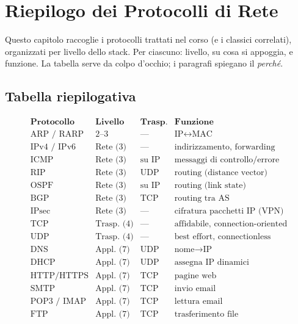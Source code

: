 \documentclass[11pt,a4paper]{report}
\begin{document}
\chapter{Riepilogo dei Protocolli di Rete}

Questo capitolo raccoglie i protocolli trattati nel corso (e i classici
correlati), organizzati per livello dello stack. Per ciascuno: livello, su cosa
si appoggia, e funzione. La tabella serve da colpo d'occhio; i paragrafi
spiegano il \emph{perché}.

\section*{Tabella riepilogativa}
\[
\begin{array}{l|l|l|l}
\textbf{Protocollo} & \textbf{Livello} & \textbf{Trasp.} & \textbf{Funzione} \\ \hline
\text{ARP / RARP} & \text{2--3} & \text{---} & \text{IP}\leftrightarrow\text{MAC} \\
\text{IPv4 / IPv6} & \text{Rete (3)} & \text{---} & \text{indirizzamento, forwarding} \\
\text{ICMP} & \text{Rete (3)} & \text{su IP} & \text{messaggi di controllo/errore} \\
\text{RIP} & \text{Rete (3)} & \text{UDP} & \text{routing (distance vector)} \\
\text{OSPF} & \text{Rete (3)} & \text{su IP} & \text{routing (link state)} \\
\text{BGP} & \text{Rete (3)} & \text{TCP} & \text{routing tra AS} \\
\text{IPsec} & \text{Rete (3)} & \text{---} & \text{cifratura pacchetti IP (VPN)} \\
\text{TCP} & \text{Trasp. (4)} & \text{---} & \text{affidabile, connection-oriented} \\
\text{UDP} & \text{Trasp. (4)} & \text{---} & \text{best effort, connectionless} \\
\text{DNS} & \text{Appl. (7)} & \text{UDP} & \text{nome}\to\text{IP} \\
\text{DHCP} & \text{Appl. (7)} & \text{UDP} & \text{assegna IP dinamici} \\
\text{HTTP/HTTPS} & \text{Appl. (7)} & \text{TCP} & \text{pagine web} \\
\text{SMTP} & \text{Appl. (7)} & \text{TCP} & \text{invio email} \\
\text{POP3 / IMAP} & \text{Appl. (7)} & \text{TCP} & \text{lettura email} \\
\text{FTP} & \text{Appl. (7)} & \text{TCP} & \text{trasferimento file} \\

\end{array}\]
\end{document}

